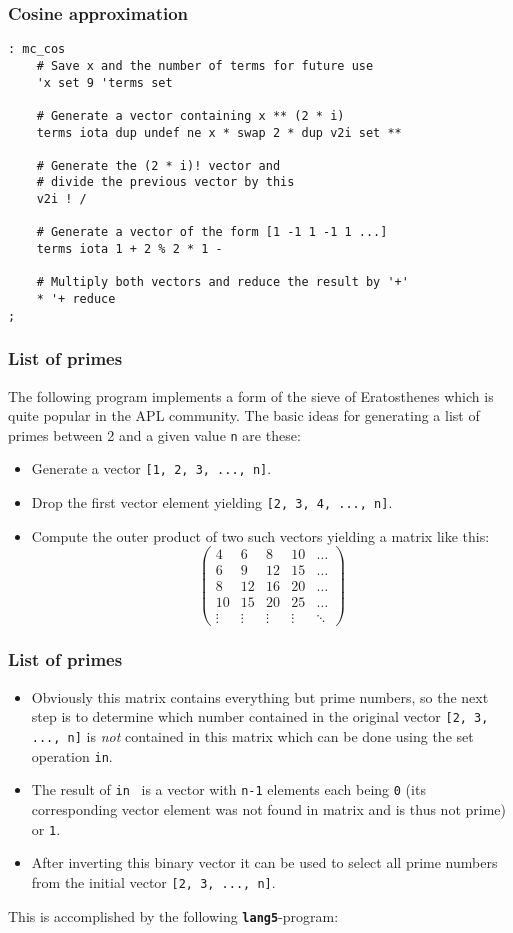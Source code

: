 \documentclass{beamer}
\newcommand*{\F}{{\tt\bf lang5}}
\begin{document}
%
  \begin{frame}[containsverbatim]
   \frametitle{Cosine approximation}
   {\small
    \begin{verbatim}
: mc_cos 
    # Save x and the number of terms for future use
    'x set 9 'terms set

    # Generate a vector containing x ** (2 * i)
    terms iota dup undef ne x * swap 2 * dup v2i set **

    # Generate the (2 * i)! vector and 
    # divide the previous vector by this
    v2i ! /

    # Generate a vector of the form [1 -1 1 -1 1 ...]
    terms iota 1 + 2 % 2 * 1 -

    # Multiply both vectors and reduce the result by '+'
    * '+ reduce
;
    \end{verbatim}
   }
  \end{frame}
%
  \begin{frame}
   \frametitle{List of primes}
   The following program implements a form of the sieve of Eratosthenes
   which is quite popular in the APL community. The basic ideas for 
   generating a list of primes between 2 and a given value {\tt n} are these:
   \begin{itemize}
    \item Generate a vector {\tt [1, 2, 3, ..., n]}.
    \item Drop the first vector element yielding {\tt [2, 3, 4, ..., n]}.
    \item Compute the outer product of two such vectors yielding a matrix
     like this:
     \begin{displaymath}
      \begin{pmatrix}
       4&6&8&10&\dots\\
       6&9&12&15&\dots\\
       8&12&16&20&\dots\\
       10&15&20&25&\dots\\
       \vdots&\vdots&\vdots&\vdots&\ddots
      \end{pmatrix}
     \end{displaymath}
   \end{itemize}
  \end{frame}
%
  \begin{frame}
   \frametitle{List of primes}
   \begin{itemize}
    \item Obviously this matrix contains everything but prime numbers, so 
     the next step is to determine which number contained in the original
     vector {\tt [2, 3, ..., n]} is \emph{not} contained in this matrix which
     can be done using the set operation {\tt in}. 
    \item The result of {\tt in}{~} is a vector with {\tt n-1} elements 
     each being {\tt 0} (its corresponding vector element was not found in 
     matrix and is thus not prime) or {\tt 1}.
    \item After inverting this binary vector it can be used to select
     all prime numbers from the initial vector {\tt [2, 3, ..., n]}.
   \end{itemize}

   This is accomplished by the following \F-program:
  \end{frame}
\end{document}
